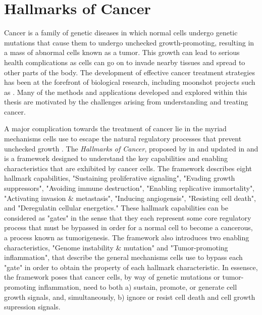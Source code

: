 \section{Hallmarks of Cancer}
Cancer is a family of genetic diseases in which normal cells undergo genetic mutations that cause them to undergo unchecked growth-promoting, resulting in a mass of abnormal cells known as a tumor.
This growth can lead to serious health complications as cells
can go on to invade nearby tissues and spread to other parts of the body.
The development of effective cancer treatment strategies has been at the forefront of biological research, including moonshot projects such as \cite{need}. %
Many of the methods and applications developed and explored within this thesis are motivated by the challenges arising from understanding and treating cancer.

A major complication towards the treatment of cancer lie in the myriad mechanisms cells use to escape the natural regulatory processes that prevent unchecked growth \cite{need}.
The \emph{Hallmarks of Cancer}, proposed by \citeauthor{foo} in \citeyear{foo} and updated in \citeyear{foo} and \citeyear{foo} is a framework designed to understand the key capabilities and enabling characteristics that are exhibited by cancer cells.
The framework describes eight hallmark capabilities,
"Sustaining proliferative signaling", 
"Evading growth suppressors",
"Avoiding immune destruction",
"Enabling replicative immortality",
"Activating invasion \& metastasis",
"Inducing angiogensis",
"Resisting cell death",
and "Deregulatin cellular energetics."
These hallmark capabilities can be considered as "gates" in the sense that they each represent some core regulatory process that must be bypassed in order for a normal cell to become a cancerous, a process known as tumorigenesis. %
The framework also introduces two enabling characteristics, "Genome instability \& mutation" and "Tumor-promoting inflammation", that describe the general mechanisms cells use to bypass each "gate" in order to obtain the property of each hallmark characteristic.
In essensce, the framework poses that cancer cells, by way of genetic mutations or tumor-promoting inflammation, need to both
a) sustain, promote, or generate cell growth signals, and, simultaneously,
b) ignore or resist cell death and cell growth supression signals.

